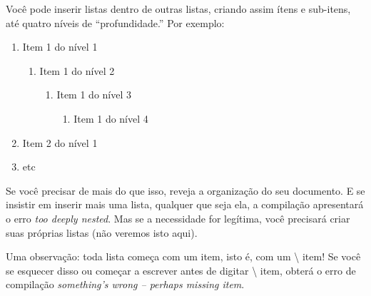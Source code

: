 \documentclass[a4paper,12pt]{article}
\newcommand{\comando}[1]{{\normalfont\sffamily\textbackslash\color{blue!30!black} #1}}
\newcommand{\foreign}[1]{\textsl{#1}}
\begin{document}
	Você pode inserir listas dentro de outras listas, criando assim ítens e sub-itens, até quatro níveis de ``profundidade.'' Por exemplo:

	\begin{enumerate}
		\item Item 1 do nível 1
		\begin{enumerate}
			\item Item 1 do nível 2
			\begin{enumerate}
				\item Item 1 do nível 3
				\begin{enumerate}
					\item Item 1 do nível 4
				\end{enumerate}
			\end{enumerate}
		\end{enumerate}

		\item Item 2 do nível 1
		\item etc
	\end{enumerate}

	Se você precisar de mais do que isso, reveja a organização do seu documento. E se insistir em inserir mais uma lista, qualquer que seja ela, a compilação	apresentará o erro \foreign{too deeply nested}. Mas se a necessidade for legítima, você precisará criar suas próprias listas (não veremos isto aqui).

	Uma observação: toda lista começa com um item, isto é, com um \comando{item}! Se você se esquecer disso ou começar a escrever antes de digitar \comando{item}, obterá o erro de compilação \foreign{something's wrong -- perhaps missing item}.
\end{document}
